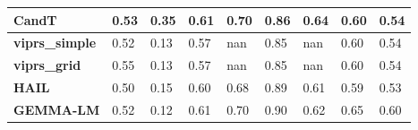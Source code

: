 \documentclass[pdflatex,sn-nature]{sn-jnl}%
\begin{document}
\begin{table}[!ht]
{\begin{tabular}{|l|l|l|l|l|l|l|l|l|}
\textbf{CandT}               & \cellcolor[HTML]{F5E884}0.53 & \cellcolor[HTML]{95CD7E}0.35 & \cellcolor[HTML]{C0D981}0.61 & \cellcolor[HTML]{FDEB84}0.70                                                     & \cellcolor[HTML]{FEEB84}0.86                                         & \cellcolor[HTML]{FEEA83}0.64                                                 & \cellcolor[HTML]{F5E884}0.60                                                    & \cellcolor[HTML]{FEE783}0.54 \\ \hline
\textbf{viprs\_simple}  \cite{Zabad_2023}     & \cellcolor[HTML]{FDD27F}0.52 & \cellcolor[HTML]{FBAD78}0.13 & \cellcolor[HTML]{FCC17B}0.57 & nan                                                                              & \cellcolor[HTML]{FEE583}0.85                                         & nan                                                                          & \cellcolor[HTML]{FAEA84}0.60                                                    & \cellcolor[HTML]{FEE582}0.54 \\ \hline
\textbf{viprs\_grid}    \cite{Zabad_2023}     & \cellcolor[HTML]{D4DF82}0.55 & \cellcolor[HTML]{FBAE78}0.13 & \cellcolor[HTML]{FDC97D}0.57 & nan                                                                              & \cellcolor[HTML]{FEE683}0.85                                         & nan                                                                          & \cellcolor[HTML]{F2E884}0.60                                                    & \cellcolor[HTML]{FEE983}0.54 \\ \hline
\textbf{HAIL}      \cite{Zhao_2024}          & \cellcolor[HTML]{F8696B}0.50 & \cellcolor[HTML]{FCBA7A}0.15 & \cellcolor[HTML]{E1E383}0.60 & \cellcolor[HTML]{FBA676}0.68                                                     & \cellcolor[HTML]{BFD981}0.89                                         & \cellcolor[HTML]{F8696B}0.61                                                 & \cellcolor[HTML]{FEEB84}0.59                                                    & \cellcolor[HTML]{FCC47C}0.53 \\ \hline
\textbf{GEMMA-LM}   \cite{Zhou_2012}         & \cellcolor[HTML]{FDD57F}0.52 & \cellcolor[HTML]{FBAA77}0.12 & \cellcolor[HTML]{BDD881}0.61 & \cellcolor[HTML]{FEE482}0.70                                                     & \cellcolor[HTML]{A8D27F}0.90                                         & \cellcolor[HTML]{FCB679}0.62                                                 & \cellcolor[HTML]{92CC7E}0.65                                                    & \cellcolor[HTML]{63BE7B}0.60 \\ \hline

\end{tabular}}
\end{table}
\end{document}
